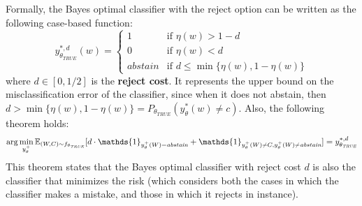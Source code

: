 Formally, the Bayes optimal classifier with the reject option can be written as the following case-based function:
\begin{equation*}
    y_{\theta_\textit{TRUE}}^{*,d}(w) = 
    \begin{cases}
        1 & \text{if } \eta(w) > 1 - d \\
        0 & \text{if } \eta(w) < d \\
        \textit{abstain} & \text{if } d \leq \min\{\eta(w), 1-\eta(w)\}
    \end{cases}
\end{equation*}
where $d \in [0, 1/2]$ is the \textbf{reject cost}. It represents the upper bound on the misclassification error of the classifier, since when it does not abstain, then $d > \min\{\eta(w), 1-\eta(w)\} = P_{\theta_\textit{TRUE}}(y_{\theta}^* (w) \not = c)$. Also, the following theorem holds:
\begin{equation*}
    \arg \min_{y_{\theta}^+} \E_{(W,C) \sim f_{\theta_\textit{TRUE}}}[d \cdot \mathds{1}_{y_{\theta}^+(W)=\textit{abstain}} + \mathds{1}_{y_{\theta}^+ (W) \not = C, y_{\theta}^+ (W) \not = \textit{abstain}}] = y_{\theta_\textit{TRUE}}^{*,d}
\end{equation*}
This theorem states that the Bayes optimal classifier with reject cost $d$ is also the classifier that minimizes the risk (which considers both the cases in which the classifier makes a mistake, and those in which it rejects in instance).


